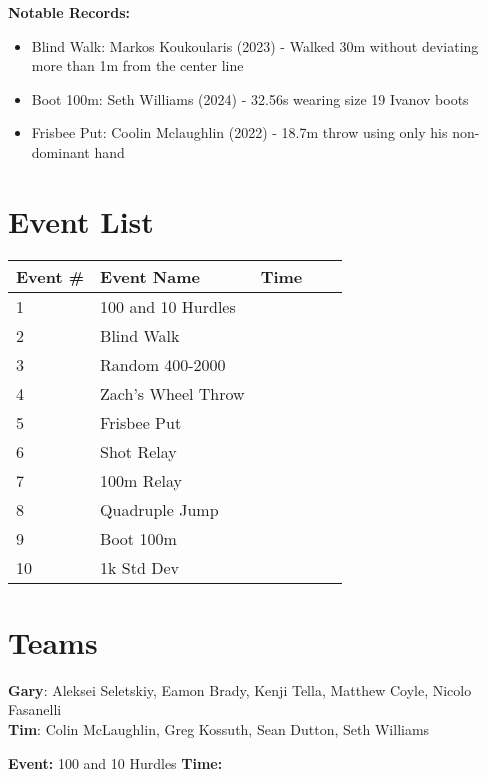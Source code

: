 \documentclass[10pt]{article}
\begin{document}
\vspace{0.5em}
\textbf{Notable Records:}
\begin{itemize}
  \item Blind Walk: Markos Koukoularis (2023) - Walked 30m without deviating more than 1m from the center line
  \item Boot 100m: Seth Williams (2024) - 32.56s wearing size 19 Ivanov boots
  \item Frisbee Put: Coolin Mclaughlin (2022) - 18.7m throw using only his non-dominant hand
\end{itemize}


\vspace{1em}

\section*{Event List}

\begin{tabular}{@{}lllll@{}}
\toprule
\textbf{Event \#} & \textbf{Event Name} &  \textbf{Time} \\
\midrule
1 & 100 and 10 Hurdles &  \\
2 & Blind Walk &  \\
3 & Random 400-2000 &  \\
4 & Zach's Wheel Throw &  \\
5 & Frisbee Put &  \\
6 & Shot Relay &  \\
7 & 100m Relay &  \\
8 & Quadruple Jump &  \\
9 & Boot 100m &  \\
10 & 1k Std Dev &  \\
\bottomrule
\end{tabular}


\vspace{2em}
\section*{Teams}

\textbf{Gary}: Aleksei Seletskiy, Eamon Brady, Kenji Tella, Matthew Coyle, Nicolo Fasanelli
\\\textbf{Tim}: Colin McLaughlin, Greg Kossuth, Sean Dutton, Seth Williams

\twocolumn


\textbf{Event:} 100 and 10 Hurdles \quad \textbf{Time:}  
\end{document}
